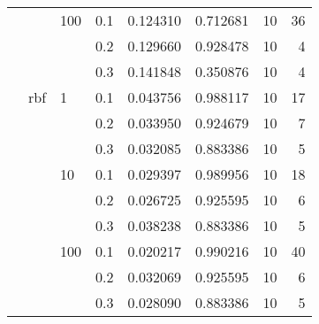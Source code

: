 \begin{table}[H]
\begin{tabular}{llllrrrr}
       &     & 100 & 0.1 &     0.124310 &  0.712681 &        10 &    36 \\
       &     &     & 0.2 &     0.129660 &  0.928478 &        10 &     4 \\
       &     &     & 0.3 &     0.141848 &  0.350876 &        10 &     4 \\
       & rbf & 1   & 0.1 &     0.043756 &  0.988117 &        10 &    17 \\
       &     &     & 0.2 &     0.033950 &  0.924679 &        10 &     7 \\
       &     &     & 0.3 &     0.032085 &  0.883386 &        10 &     5 \\
       &     & 10  & 0.1 &     0.029397 &  0.989956 &        10 &    18 \\
       &     &     & 0.2 &     0.026725 &  0.925595 &        10 &     6 \\
       &     &     & 0.3 &     0.038238 &  0.883386 &        10 &     5 \\
       &     & 100 & 0.1 &     0.020217 &  0.990216 &        10 &    40 \\
       &     &     & 0.2 &     0.032069 &  0.925595 &        10 &     6 \\
       &     &     & 0.3 &     0.028090 &  0.883386 &        10 &     5 \\
\bottomrule
\end{tabular}
\end{table}
